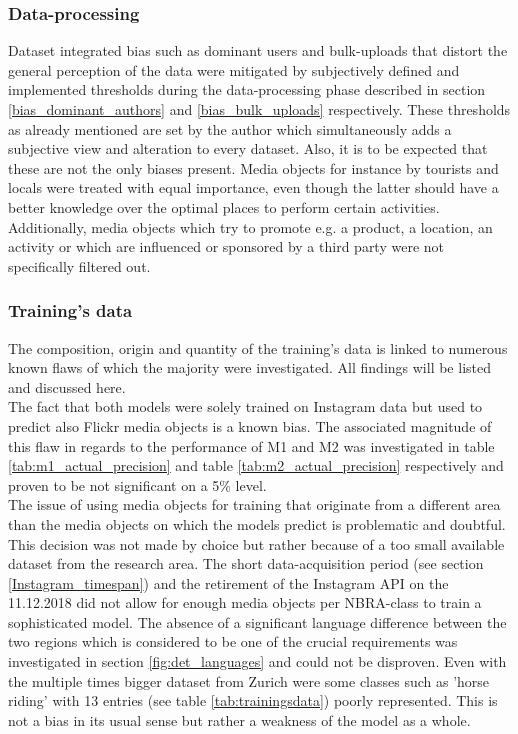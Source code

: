 \subsubsection*{Data-processing} Dataset integrated bias such as dominant users and bulk-uploads that distort the general perception of the data were mitigated by subjectively defined and implemented thresholds during the data-processing phase described in section \ref{bias_dominant_authors} and \ref{bias_bulk_uploads} respectively. These thresholds as already mentioned are set by the author which simultaneously adds a subjective view and alteration to every dataset. Also, it is to be expected that these are not the only biases present. Media objects for instance by tourists and locals were treated with equal importance, even though the latter should have a better knowledge over the optimal places to perform certain activities. Additionally, media objects which try to promote e.g. a product, a location, an activity or which are influenced or sponsored by a third party were not specifically filtered out.\\

\subsubsection*{Training's data} The composition, origin and quantity of the training's data is linked to numerous known flaws of which the majority were investigated. All findings will be listed and discussed here. \\
The fact that both models were solely trained on Instagram data but used to predict also Flickr media objects is a known bias. The associated magnitude of this flaw in regards to the performance of M1 and M2 was investigated in table \ref{tab:m1_actual_precision} and table \ref{tab:m2_actual_precision} respectively and proven to be not significant on a 5\% level. \\
The issue of using media objects for training that originate from a different area than the media objects on which the models predict is problematic and doubtful. This decision was not made by choice but rather because of a too small available dataset from the research area. The short data-acquisition period (see section \ref{Instagram_timespan}) and the retirement of the Instagram API on the 11.12.2018 did not allow for enough media objects per NBRA-class to train a sophisticated model. The absence of a significant language difference between the two regions which is considered to be one of the crucial requirements was investigated in section \ref{fig:det_languages} and could not be disproven.
Even with the multiple times bigger dataset from Zurich were some classes such as 'horse riding' with 13 entries (see table \ref{tab:trainingsdata}) poorly represented. This is not a bias in its usual sense but rather a weakness of the model as a whole.

